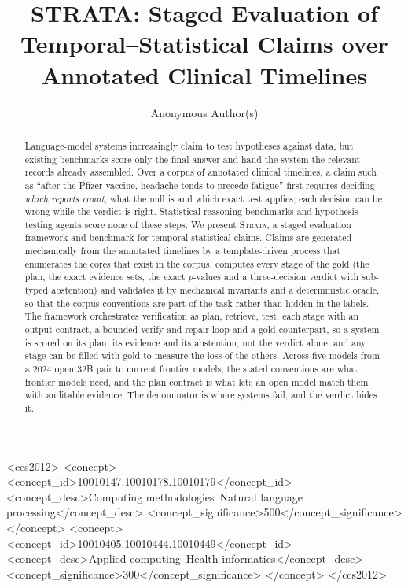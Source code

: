 \documentclass[sigconf,anonymous,review]{acmart}
\begin{document}
\title{STRATA: Staged Evaluation of Temporal--Statistical Claims over Annotated Clinical Timelines}

\author{Anonymous Author(s)}

\begin{abstract}
Language-model systems increasingly claim to test hypotheses against data,
but existing benchmarks score only the final answer and hand the system the
relevant records already assembled. Over a corpus of annotated clinical
timelines, a claim such as ``after the Pfizer vaccine, headache tends to
precede fatigue'' first requires deciding \emph{which reports count}, what the
null is and which exact test applies; each decision can be wrong while the
verdict is right. Statistical-reasoning benchmarks and hypothesis-testing
agents score none of these steps. We present \textsc{Strata}, a staged
evaluation framework and benchmark for temporal-statistical claims. Claims
are generated mechanically from the annotated timelines by a template-driven
process that enumerates the cores that exist in the corpus, computes every
stage of the gold (the plan, the exact evidence sets, the exact $p$-values
and a three-decision verdict with sub-typed abstention) and validates it by
mechanical invariants and a deterministic oracle, so that the corpus
conventions are part of the task rather than hidden in the labels. The
framework orchestrates verification as plan, retrieve, test, each stage with
an output contract, a bounded verify-and-repair loop and a gold counterpart,
so a system is scored on its plan, its evidence and its abstention, not the
verdict alone, and any stage can be filled with gold to measure the loss of
the others. Across five models from a 2024 open 32B pair to current frontier
models, the stated conventions are what frontier models need, and the plan
contract is what lets an open model match them with auditable evidence. The
denominator is where systems fail, and the verdict hides it.
\end{abstract}

\begin{CCSXML}
<ccs2012>
<concept>
<concept_id>10010147.10010178.10010179</concept_id>
<concept_desc>Computing methodologies~Natural language processing</concept_desc>
<concept_significance>500</concept_significance>
</concept>
<concept>
<concept_id>10010405.10010444.10010449</concept_id>
<concept_desc>Applied computing~Health informatics</concept_desc>
<concept_significance>300</concept_significance>
</concept>
</ccs2012>
\end{CCSXML}


\maketitle







\end{document}
